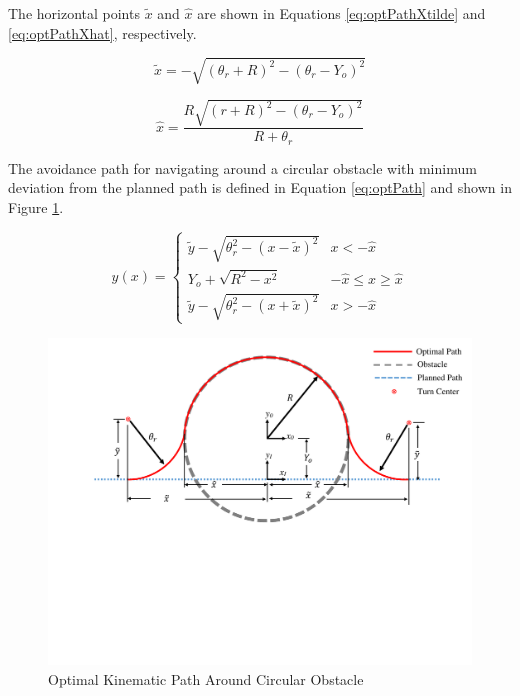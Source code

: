 \documentclass[numbered,pdftex]{ohio-etd}
\begin{document}
\noindent
The horizontal points $\tilde{x}$ and $\hat{x}$ are shown in Equations \ref{eq:optPathXtilde} and \ref{eq:optPathXhat}, respectively. 

\begin{equation}
\label{eq:optPathXtilde}
\widetilde{x} = -\sqrt{(\theta_r+R)^2 - (\theta_r-Y_o)^2}
\end{equation}

\begin{equation}
\label{eq:optPathXhat}
\hat{x} = \frac{R\sqrt{(r+R)^2-(\theta_r-Y_o)^2}}{R+\theta_r}
\end{equation}

\noindent
The avoidance path for navigating around a circular obstacle with minimum deviation from the planned path is defined in Equation \ref{eq:optPath} and shown in Figure \ref{fig:optimalpath}.


\begin{equation}
\label{eq:optPath}
y(x) = \left\{
\begin{array}{ll}
\widetilde{y} -\sqrt{\theta_r^2 - (x-\widetilde{x})^2} &  x < -\hat{x} \\
Y_o +\sqrt{R^2 - x^2} & -\hat{x} \leq x \geq \hat{x}\\
\widetilde{y} -\sqrt{\theta_r^2 - (x+\widetilde{x})^2}&  x > -\hat{x}
\end{array}
\right.
\end{equation}

\begin{figure}[H]
	\centering
	\includegraphics[width=0.7\linewidth ,trim=0 265 0 20,clip,width=15cm]{Figures/optimalPath/optimalPath}
	\caption{Optimal Kinematic Path Around Circular Obstacle}
	\label{fig:optimalpath}
\end{figure}
\end{document}
